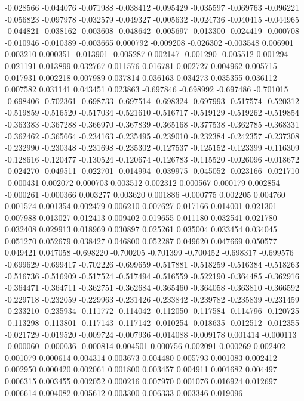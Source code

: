 -0.028566
-0.044076
-0.071988
-0.038412
-0.095429
-0.035597
-0.069763
-0.096221
-0.056823
-0.097978
-0.032579
-0.049327
-0.005632
-0.024736
-0.040415
-0.044965
-0.044821
-0.038162
-0.003608
-0.048642
-0.005697
-0.013300
-0.024419
-0.000708
-0.010946
-0.010389
-0.003665
0.000792
-0.009208
-0.026302
-0.003548
0.006901
0.003210
0.000351
-0.013901
-0.005287
0.002147
-0.001290
-0.005512
0.001294
0.021191
0.013899
0.032767
0.011576
0.016781
0.002727
0.004962
0.005715
0.017931
0.002218
0.007989
0.037814
0.036163
0.034273
0.035355
0.036112
0.007582
0.031141
0.043451
0.023863
-0.697846
-0.698992
-0.697486
-0.701015
-0.698406
-0.702361
-0.698733
-0.697514
-0.698324
-0.697993
-0.517574
-0.520312
-0.519859
-0.516520
-0.517034
-0.521610
-0.516717
-0.519129
-0.519262
-0.519854
-0.363383
-0.367288
-0.366970
-0.367839
-0.365168
-0.377538
-0.362785
-0.368331
-0.362462
-0.365664
-0.234163
-0.235495
-0.239010
-0.232384
-0.242357
-0.237308
-0.232990
-0.230348
-0.231698
-0.235302
-0.127537
-0.125152
-0.123399
-0.116309
-0.128616
-0.120477
-0.130524
-0.120674
-0.126783
-0.115520
-0.026096
-0.018672
-0.024270
-0.049511
-0.022701
-0.014994
-0.039975
-0.045052
-0.023166
-0.021710
-0.000431
0.002072
0.000703
0.003512
0.002312
0.000567
0.000179
0.002854
-0.000261
-0.000366
0.003277
0.003620
0.001886
-0.000775
0.002205
0.004760
0.001574
0.001354
0.002479
0.006210
0.007627
0.017166
0.014001
0.021301
0.007988
0.013027
0.012413
0.009402
0.019655
0.011180
0.032541
0.021780
0.032408
0.029913
0.018969
0.030897
0.025261
0.035004
0.033454
0.034045
0.051270
0.052679
0.038427
0.046800
0.052287
0.049620
0.047669
0.050577
0.049421
0.047058
-0.698220
-0.700205
-0.701399
-0.700452
-0.698317
-0.699576
-0.699629
-0.699417
-0.702226
-0.699659
-0.517881
-0.518259
-0.516384
-0.518263
-0.516736
-0.516909
-0.517524
-0.517494
-0.516559
-0.522190
-0.364485
-0.362916
-0.364471
-0.364711
-0.362751
-0.362684
-0.365460
-0.364058
-0.363810
-0.366592
-0.229718
-0.232059
-0.229963
-0.231426
-0.233842
-0.239782
-0.235839
-0.231459
-0.233210
-0.235934
-0.111772
-0.114042
-0.112050
-0.117584
-0.114796
-0.120725
-0.113298
-0.113801
-0.117143
-0.117142
-0.010254
-0.018635
-0.012512
-0.012355
-0.021729
-0.019520
-0.009724
-0.007936
-0.014088
-0.009178
0.001414
-0.000113
-0.000060
-0.000036
-0.000814
0.004501
0.000756
0.002091
0.000269
0.002402
0.001079
0.000614
0.004314
0.003673
0.004480
0.005793
0.001083
0.002412
0.002950
0.000420
0.002061
0.001800
0.003457
0.004911
0.001682
0.004497
0.006315
0.003455
0.002052
0.000216
0.007970
0.001076
0.016924
0.012697
0.006614
0.004082
0.005612
0.003300
0.006333
0.003346
0.019096
